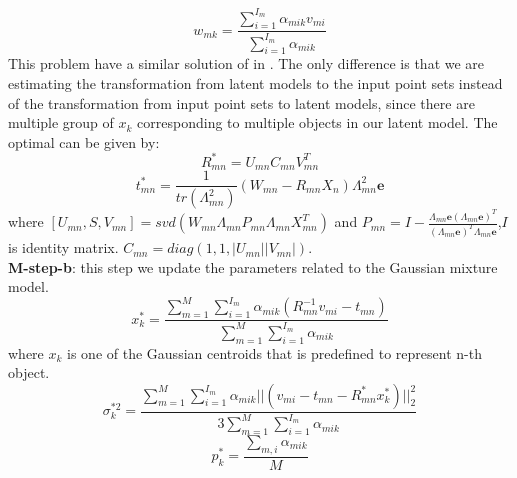 \begin{equation}
w_{mk}=\frac{\sum_{i=1}^{I_m}\alpha_{mik}v_{mi}}{\sum_{i=1}^{I_m}\alpha_{mik}}
\end{equation}
This problem have a similar solution of in \cite{Evangelidis2014}. The only difference is that we are estimating the transformation from latent models to the input point sets instead of the transformation from input point sets to latent models, since there are multiple group of $x_k$ corresponding to multiple objects in our latent model. The optimal can be given by:\\
\begin{equation}
\label{equ:updateR}
R_{mn}^*=U_{mn}C_{mn}V_{mn}^T
\end{equation}
\begin{equation}
\label{equ:updatet}
t_{mn}^*=\frac{1}{tr(\Lambda_{mn}^2)}(W_{mn}-R_{mn}X_n)\Lambda_{mn}^2\mathbf{e}
\end{equation}
where $[U_{mn},S,V_{mn}]=svd( W_{mn}\Lambda_{mn}P_{mn}\Lambda_{mn}X_{mn}^T )$ and $P_{mn}=I-\frac{\Lambda_{mn}\mathbf{e}(\Lambda_{mn}\mathbf{e})^T}{(\Lambda_{mn}\mathbf{e})^T\Lambda_{mn}\mathbf{e}}$,$I$ is identity matrix. $C_{mn}=diag(1,1,|U_{mn}||V_{mn}|)$.\\
\textbf{M-step-b}: this step we update the parameters related to the Gaussian mixture model. 
\begin{equation}
\label{equ:updatexk}
x_k^*=\frac{\sum_{m=1}^M\sum_{i=1}^{I_m}\alpha_{mik}(R_{mn}^{-1}v_{mi}-t_{mn})}{\sum_{m=1}^M\sum_{i=1}^{I_m}\alpha_{mik}}
\end{equation}
where $x_k$ is one of the Gaussian centroids that is predefined to represent n-th object. 
\begin{equation}
\label{equ:updatesigma}
\sigma_k^{*2}=\frac{\sum_{m=1}^M\sum_{i=1}^{I_m}\alpha_{mik}||(v_{mi}-t_{mn}-R_{mn}^*x_k^*)||_2^2}{3\sum_{m=1}^M\sum_{i=1}^{I_m}\alpha_{mik}}
\end{equation}
\begin{equation}
\label{equ:updatepk}
p_k^*=\frac{\sum_{m,i}\alpha_{mik}}{M}
\end{equation}
